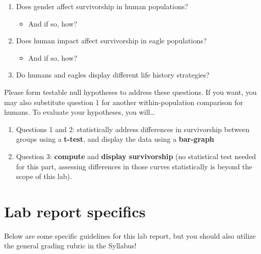 \documentclass[11pt,]{article}
\providecommand{\tightlist}{%
\setlength{\itemsep}{0pt}\setlength{\parskip}{0pt}}
\begin{document}
\begin{enumerate}
\def\labelenumi{\arabic{enumi}.}
\tightlist
\item
  Does gender affect survivorship in human populations?

  \begin{itemize}
  \tightlist
  \item
    And if so, how?
  \end{itemize}
\item
  Does human impact affect survivorship in eagle populations?

  \begin{itemize}
  \tightlist
  \item
    And if so, how?
  \end{itemize}
\item
  Do humans and eagles display different life history strategies?
\end{enumerate}

Please form testable null hypotheses to address these questions. If you
want, you may also substitute question 1 for another within-population
comparison for humans. To evaluate your hypotheses, you will\ldots{}

\begin{enumerate}
\def\labelenumi{\arabic{enumi}.}
\tightlist
\item
  Questions 1 and 2: statistically address differences in survivorship
  between groups using a \textbf{t-test}, and display the data using a
  \textbf{bar-graph}
\item
  Question 3: \textbf{compute} and \textbf{display survivorship} (no
  statistical test needed for this part, assessing differences in those
  curves statistically is beyond the scope of this lab).
\end{enumerate}

\pagebreak

\section{Lab report specifics}\label{lab-report-specifics}

Below are some specific guidelines for this lab report, but you should
also utilize the general grading rubric in the Syllabus!
\end{document}
